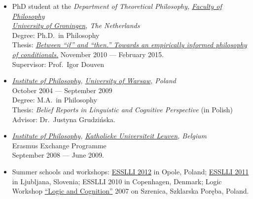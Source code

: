 \documentclass[a4paper,12pt]{article}
\begin{document}
\begin{small}
  
  \begin{itemize}
    \item PhD student at
    the %
    \emph{Department of Theoretical Philosophy, \href{http://www.rug.nl/filosofie/}{Faculty of Philosophy}\\
    \href{http://www.rug.nl}{University of Groningen}, The Netherlands}\\
    Degree: Ph.D.\ in Philosophy\\
    Thesis: \emph{\href{http://karolinakrzyzanowska.com/pdfs/krzyzanowska-phd-final.pdf}{Between ``if'' and ``then.'' Towards an empirically informed philosophy of conditionals.}} 
    November 2010 --- February 2015.\\
    Supervisor: Prof.\ Igor Douven  
    
    \item \emph{\href{http://www.filozofia.uw.edu.pl}{Institute of Philosophy}, \href{http://www.uw.edu.pl}{University of Warsaw}, Poland}\\
    October 2004 --- September 2009\\
    Degree: M.A.\ in Philosophy\\
    Thesis: \emph{Belief Reports in Linguistic and Cognitive Perspective} (in Polish)\\
    Advisor: Dr.\ Justyna Grudzińska.
    
    \item \emph{\href{http://hiw.kuleuven.be/eng/}{Institute of Philosophy}, \href{http://www.kuleuven.be}{Katholieke Universiteit Leuven}, Belgium}\\
    Erasmus Exchange Programme\\
    September 2008 --- June 2009.
  

    \item Summer schools and workshops:
    \href{http://www.esslli2012.pl}{ESSLLI 2012} in Opole, Poland;
    \href{http://esslli2011.ijs.si}{ESSLLI 2011} in Ljubljana, Slovenia;
    ESSLLI 2010 in Copenhagen, Denmark;
    Logic Workshop \href{http://www.logika.uw.edu.pl/warsztaty2007/index.html}{``Logic
      and Cognition''} 2007 on Szrenica, Szklarska Poręba, Poland.


\end{itemize}
\end{small}
\end{document}

